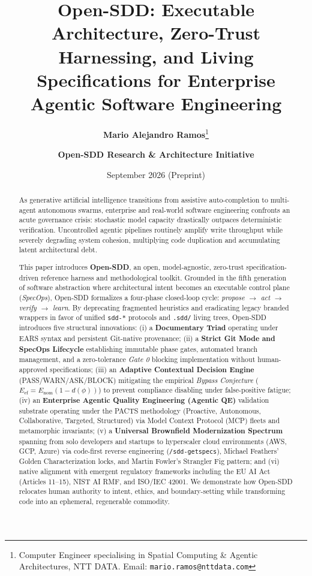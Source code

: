 \documentclass[11pt,a4paper]{article}
\title{\textbf{Open-SDD: Executable Architecture, Zero-Trust Harnessing, and Living Specifications for Enterprise Agentic Software Engineering}}
\author{
    \textbf{Mario Alejandro Ramos}\thanks{Computer Engineer specialising in Spatial Computing \& Agentic Architectures, NTT DATA. Email: \texttt{mario.ramos@nttdata.com}}
    \and
    \textbf{Open-SDD Research \& Architecture Initiative}
}
\date{September 2026 (Preprint)}
\begin{document}
\maketitle

\begin{abstract}
As generative artificial intelligence transitions from assistive auto-completion to multi-agent autonomous swarms, enterprise and real-world software engineering confronts an acute governance crisis: stochastic model capacity drastically outpaces deterministic verification. Uncontrolled agentic pipelines routinely amplify write throughput while severely degrading system cohesion, multiplying code duplication and accumulating latent architectural debt. 

This paper introduces \textbf{Open-SDD}, an open, model-agnostic, zero-trust specification-driven reference harness and methodological toolkit. Grounded in the fifth generation of software abstraction where architectural intent becomes an executable control plane (\textit{SpecOps}), Open-SDD formalizes a four-phase closed-loop cycle: \textit{propose $\rightarrow$ act $\rightarrow$ verify $\rightarrow$ learn}. By deprecating fragmented heuristics and eradicating legacy branded wrappers in favor of unified \texttt{sdd-*} protocols and \texttt{.sdd/} living trees, Open-SDD introduces five structural innovations: 
(i) a \textbf{Documentary Triad} operating under EARS syntax and persistent Git-native provenance; 
(ii) a \textbf{Strict Git Mode and SpecOps Lifecycle} establishing immutable phase gates, automated branch management, and a zero-tolerance \textit{Gate 0} blocking implementation without human-approved specifications; 
(iii) an \textbf{Adaptive Contextual Decision Engine} (PASS/WARN/ASK/BLOCK) mitigating the empirical \textit{Bypass Conjecture} ($E_{\text{ef}} = E_{\text{nom}}(1 - d(\phi))$) to prevent compliance disabling under false-positive fatigue; 
(iv) an \textbf{Enterprise Agentic Quality Engineering (Agentic QE)} validation substrate operating under the PACTS methodology (Proactive, Autonomous, Collaborative, Targeted, Structured) via Model Context Protocol (MCP) fleets and metamorphic invariants; 
(v) a \textbf{Universal Brownfield Modernization Spectrum} spanning from solo developers and startups to hyperscaler cloud environments (AWS, GCP, Azure) via code-first reverse engineering (\texttt{/sdd-getspecs}), Michael Feathers' Golden Characterization locks, and Martin Fowler's Strangler Fig pattern; and 
(vi) native alignment with emergent regulatory frameworks including the EU AI Act (Articles 11--15), NIST AI RMF, and ISO/IEC 42001. We demonstrate how Open-SDD relocates human authority to intent, ethics, and boundary-setting while transforming code into an ephemeral, regenerable commodity.
\end{abstract}
\end{document}

